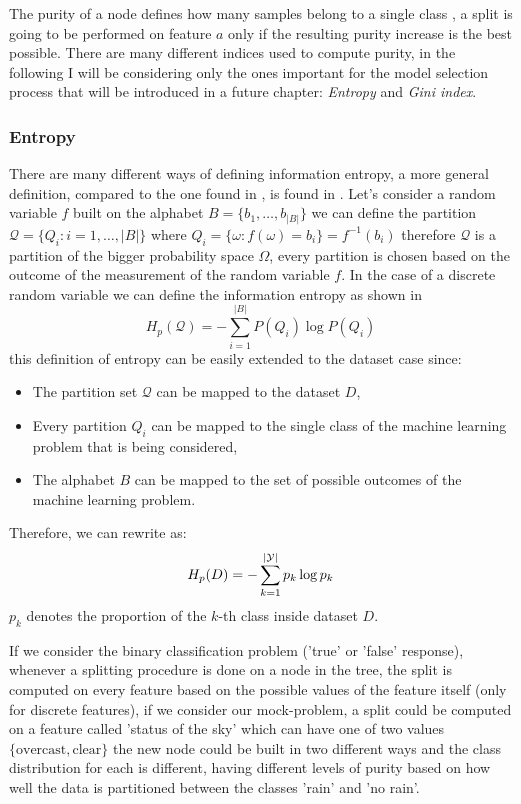 \medskip

The purity of a node defines how many samples belong to a single class \cite{ZhouZhi-Hua2021ML}, a
split is going to be performed on feature $a$ only if the resulting purity increase is the best
possible. There are many different indices used to compute purity, in the following I will be
considering only the ones important for the model selection process that will be introduced in
a future chapter: \emph{Entropy} and \emph{Gini index}.

\subsubsection{Entropy}
There are many different ways of defining information entropy, a more general definition, compared
to the one found in \cite{ZhouZhi-Hua2021ML}, is found in \cite{gray2011entropy}. Let's consider a
random variable $f$ built on the alphabet $B = \{b_1, \ldots, b_{|B|}\}$ we can define the
partition $\mathcal{Q} = \{Q_i: i = 1, \ldots, |B|\}$ where $Q_i = \{\omega: f(\omega) = b_i\} = f^{-1}(b_i)$ therefore $\mathcal{Q}$ is a partition of the bigger
probability space $\Omega$, every partition is chosen based on the outcome of the
measurement of the random variable $f$. In the case of a discrete random variable we can define the
information entropy as shown in 
\begin{equation}
	\label{eq:information-entropy}
	H_p(\mathcal{Q}) = - \sum_{i = 1}^{|B|}{P(Q_i)\log{P(Q_i)}}
\end{equation}
this definition of entropy can be easily extended to the dataset case since:
\begin{itemize}
	\item The partition set $\mathcal{Q}$ can be mapped to the dataset $D$,
	\item Every partition $Q_i$ can be mapped to the single class of the machine learning
	      problem that is being considered,
	\item The alphabet $B$ can be mapped to the set of possible outcomes of the machine learning
	      problem.
\end{itemize}
Therefore, we can rewrite  as:
\begin{equation}
	H_p(D) = - \sum_{k = 1}^{|\mathcal{Y}|}p_k \log{p_k}
\end{equation}
$p_k$ denotes the proportion of the $k$-th class inside dataset $D$.

If we consider the binary classification problem ('true' or 'false' response), whenever a splitting procedure
is done on a node in the tree, the split is computed on every feature based on the possible
values of the feature itself (only for discrete features), if we consider our mock-problem, a split could be computed on a
feature called  'status of the sky' which can have one of two values $\{\text{overcast},
	\text{clear}\}$ the new node could be built in two different ways and
the class distribution for each is different, having different levels of purity based
on how well the data is partitioned between the classes 'rain' and 'no rain'.

